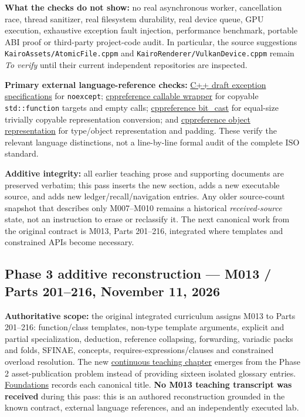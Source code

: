 \textbf{What the checks do not show:} no real asynchronous worker, cancellation race, thread sanitizer, real filesystem durability, real device queue, GPU execution, exhaustive exception fault injection, performance benchmark, portable ABI proof or third-party project-code audit. In particular, the source suggestions \texttt{KairoAssets/AtomicFile.cppm} and \texttt{KairoRenderer/VulkanDevice.cppm} remain \emph{To verify} until their current independent repositories are inspected.

\textbf{Primary external language-reference checks:} \href{https://eel.is/c++draft/except.spec}{C++ draft exception specifications} for \texttt{noexcept}; \href{https://en.cppreference.com/w/cpp/utility/functional/function}{cppreference callable wrapper} for copyable \texttt{std::function} targets and empty calls; \href{https://en.cppreference.com/w/cpp/numeric/bit_cast}{cppreference bit\_cast} for equal-size trivially copyable representation conversion; and \href{https://en.cppreference.com/w/cpp/language/object}{cppreference object representation} for type/object representation and padding. These verify the relevant language distinctions, not a line-by-line formal audit of the complete ISO standard.

\textbf{Additive integrity:} all earlier teaching prose and supporting documents are preserved verbatim; this pass inserts the new section, adds a new executable source, and adds new ledger/recall/navigation entries. Any older source-count snapshot that describes only M007--M010 remains a historical \emph{received-source} state, not an instruction to erase or reclassify it. The next canonical work from the original contract is M013, Parts 201--216, integrated where templates and constrained APIs become necessary.

\subsection{Phase 3 additive reconstruction --- M013 / Parts 201--216, November 11, 2026}\label{appendix-a103e7846d21-phase-3-additive-reconstruction-m013-parts-201216-november-11-2026}

\textbf{Authoritative scope:} the original integrated curriculum assigns M013 to Parts 201--216: function/class templates, non-type template arguments, explicit and partial specialization, deduction, reference collapsing, forwarding, variadic packs and folds, SFINAE, concepts, requires-expressions/clauses and constrained overload resolution. The new \hyperref[01-foundations-i-ch005-one-asset-pipeline-many-asset-types-generic-code-without-accidental-promises]{continuous teaching chapter} emerges from the Phase 2 asset-publication problem instead of providing sixteen isolated glossary entries. \hyperref[appendix-fd090d982a15-m013-parts-201216-generic-asset-preparation-with-constrained-apis]{Foundations} records each canonical title. \textbf{No M013 teaching transcript was received} during this pass: this is an authored reconstruction grounded in the known contract, external language references, and an independently executed lab.

